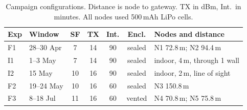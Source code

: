 \documentclass[conference]{IEEEtran}
\newcommand{\ch}[1]{\textcolor{DiffOrange}{#1}}
\newcommand{\ch}[1]{#1}
\begin{document}
\begin{table}[!t]
\centering
\caption{\ch{Campaign configurations. Distance is node to gateway. TX in dBm, Int.\ in minutes. All nodes used 500\,mAh LiPo cells.}}
\label{tab:campaigns}
\footnotesize
\setlength{\tabcolsep}{3pt}
\begin{tabular}{llccccl}
\hline
\textbf{Exp} & \textbf{Window} & \textbf{SF} & \textbf{TX} & \textbf{Int.} & \textbf{Encl.} & \textbf{Nodes and distance} \\
\hline
F1 & 28--30 Apr & 7  & 14 & 90 & sealed & N1 72.8\,m; N2 94.4\,m \\
I1 & 1--3 May   & 7  & 14 & 90 & sealed & indoor, 4\,m, through 1 wall \\
I2 & 15 May     & 10 & 16 & 90 & sealed & indoor, 2\,m, line of sight \\
F2 & 19--24 May & 10 & 16 & 60 & sealed & N3 150.8\,m \\
F3 & 8--18 Jul  & 11 & 16 & 60 & vented & N4 70.8\,m; N5 75.8\,m \\
\hline
\end{tabular}
\end{table}
\end{document}
